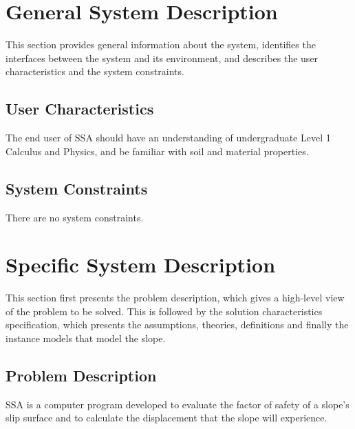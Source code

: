 \documentclass[12pt]{article}
\begin{document}
\section{General System Description}
\label{Sec:GeneSystDesc}
This section provides general information about the system, identifies the interfaces between the system and its environment, and describes the user characteristics and the system constraints.
\subsection{User Characteristics}
\label{Sec:UserChar}
The end user of SSA should have an understanding of undergraduate Level 1 Calculus and Physics, and be familiar with soil and material properties.
\subsection{System Constraints}
\label{Sec:SystCons}
There are no system constraints.
\section{Specific System Description}
\label{Sec:SpecSystDesc}
This section first presents the problem description, which gives a high-level view of the problem to be solved. This is followed by the solution characteristics specification, which presents the assumptions, theories, definitions and finally the instance models that model the slope.
\subsection{Problem Description}
\label{Sec:ProbDesc}
SSA is a computer program developed to evaluate the factor of safety of a slope's slip surface and to calculate the displacement that the slope will experience.
\end{document}
